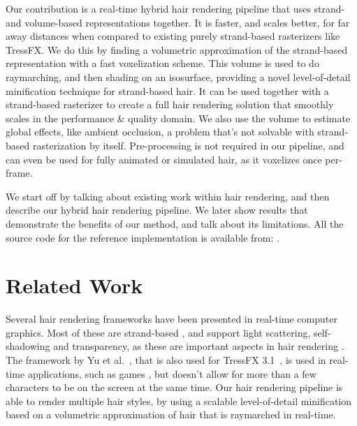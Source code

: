 \documentclass{egpubl}
\begin{document}

Our contribution is a real-time hybrid hair rendering pipeline that uses strand- and volume-based representations together. It is faster, and scales better, for far away distances when compared to existing purely strand-based rasterizers like TressFX. We do this by finding a volumetric approximation of the strand-based representation with a fast voxelization scheme. This volume is used to do raymarching, and then shading on an isosurface, providing a novel level-of-detail minification technique for strand-based hair. It can be used together with a strand-based rasterizer to create a full hair rendering solution that smoothly scales in the performance \& quality domain. We also use the volume to estimate global effects, like ambient occlusion, a problem that's not solvable with strand-based rasterization by itself. Pre-processing is not required in our pipeline, and can even be used for fully animated or simulated hair, as it voxelizes once per-frame.



We start off by talking about existing work within hair rendering, and then describe our hybrid hair rendering pipeline. We later show results that demonstrate the benefits of our method, and talk about its limitations. All the source code for the reference implementation is available from: .

\section{Related Work} \label{sec:related_work}


Several hair rendering frameworks have been presented in real-time computer graphics. Most of these are strand-based \cite{yu2012framework}, and support light scattering, self-shadowing and transparency, as these are important aspects in hair rendering \cite{ward2007survey}. The framework by Yu et al.~\cite{yu2012framework}, that is also used for TressFX 3.1~\cite{martin2014tressfx}, is used in real-time applications, such as games \cite{lacroix2013tressfx, steward2015augmented}, but doesn't allow for more than a few characters to be on the screen at the same time. Our hair rendering pipeline is able to render multiple hair styles, by using a scalable level-of-detail minification based on a volumetric approximation of hair that is raymarched in real-time.
\end{document}
